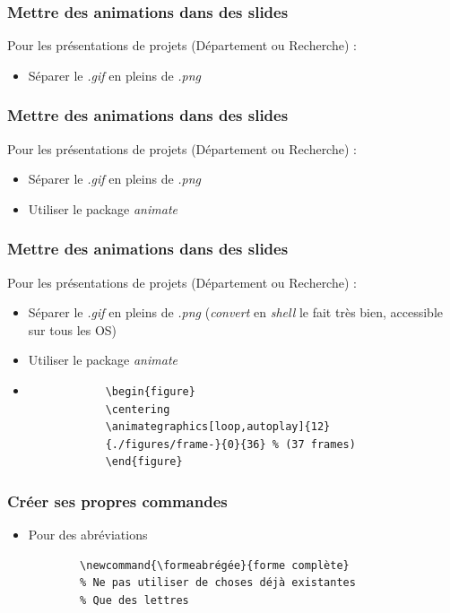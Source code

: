 \documentclass[handout]{beamer}
\begin{document}
\begin{frame}
	\frametitle{Mettre des animations dans des slides}
	\centering
	Pour les présentations de projets (Département ou Recherche) :\\
	\begin{itemize}
		\item Séparer le \textit{.gif} en pleins de \textit{.png}
	\end{itemize}
\end{frame}

\begin{frame}
	\frametitle{Mettre des animations dans des slides}
	\centering
	Pour les présentations de projets (Département ou Recherche) :\\
	\begin{itemize}
		\item Séparer le \textit{.gif} en pleins de \textit{.png}
		\item Utiliser le package \textit{animate}
	\end{itemize}
\end{frame}

\begin{frame}[fragile=singleslide]
	\frametitle{Mettre des animations dans des slides}
	\centering
	Pour les présentations de projets (Département ou Recherche) :\\
	\begin{itemize}
		\item Séparer le \textit{.gif} en pleins de \textit{.png} (\textit{convert} en \textit{shell} le fait très bien, accessible sur tous les OS)
		\item Utiliser le package \textit{animate}
		\item
			\begin{verbatim}
			\begin{figure}
		    \centering
		    \animategraphics[loop,autoplay]{12}
			{./figures/frame-}{0}{36} % (37 frames)
		    \end{figure}
			\end{verbatim}
	\end{itemize}
\end{frame}

\begin{frame}[fragile=singleslide]
	\frametitle{Créer ses propres commandes}
	\begin{itemize}
		\item Pour des abréviations\\
		\begin{verbatim}
		\newcommand{\formeabrégée}{forme complète}
		% Ne pas utiliser de choses déjà existantes
		% Que des lettres
		\end{verbatim}
	\end{itemize}
\end{frame}
\end{document}
